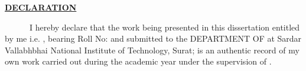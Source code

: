 
\newpage
\BgThispage{}
\begin{center}
    \textbf{\Large \underline{\textbf{DECLARATION}}}
\end{center}
\large

~~~~~~I hereby declare that the work being presented in this dissertation entitled \textbf{\MakeUppercase{\Title{}}} by me i.e. \textbf{\Atitle{} \Author{}}, bearing Roll No: \textbf{\MakeUppercase{\Rollno{}}}
and submitted to the DEPARTMENT OF \MakeUppercase{\Subject{}} at Sardar
Vallabhbhai National Institute of Technology, Surat; is an authentic
record of my own work carried out during the academic year \Year{} under the supervision of .
\vspace{50pt}\\


